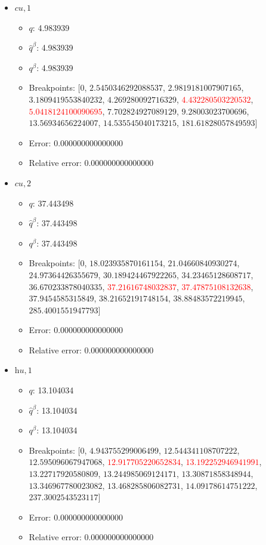 \documentclass{article}%
\begin{document}
\begin{itemize}
\begin{itemize}
		\item Error: 0.000000000000000%
		\item Relative error: 0.000000000000000%
	\end{itemize}%
	\item $\textit{cu},1$%
	\begin{itemize}%
		\item $q$: 4.983939%
		\item $\hat{q}^\beta$: 4.983939%
		\item $q^\beta$: 4.983939%
		\item Breakpoints: $[$$0$, $2.5450346292088537$, $2.9819181007907165$, $3.1809419553840232$, $4.269280092716329$, \textcolor{red}{$4.432280503220532$}, \textcolor{red}{$5.0418124100090695$}, $7.702824927089129$, $9.28003023700696$, $13.56934656224007$, $14.535545040173215$, $181.61828057849593$$]$%
		\item Error: 0.000000000000000%
		\item Relative error: 0.000000000000000%
	\end{itemize}%
	\item $\textit{cu},2$%
	\begin{itemize}%
		\item $q$: 37.443498%
		\item $\hat{q}^\beta$: 37.443498%
		\item $q^\beta$: 37.443498%
		\item Breakpoints: $[$$0$, $18.023935870161154$, $21.04660840930274$, $24.97364426355679$, $30.189424467922265$, $34.23465128608717$, $36.670233878040335$, \textcolor{red}{$37.21616748032837$}, \textcolor{red}{$37.47875108132638$}, $37.9454585315849$, $38.21652191748154$, $38.88483572219945$, $285.4001551947793$$]$%
		\item Error: 0.000000000000000%
		\item Relative error: 0.000000000000000%
	\end{itemize}%
	\item $\textit{hu},1$%
	\begin{itemize}%
		\item $q$: 13.104034%
		\item $\hat{q}^\beta$: 13.104034%
		\item $q^\beta$: 13.104034%
		\item Breakpoints: $[$$0$, $4.943755299006499$, $12.544341108707222$, $12.595096067947068$, \textcolor{red}{$12.917705220652834$}, \textcolor{red}{$13.192252946941991$}, $13.22717920580809$, $13.244985069124171$, $13.30871858348944$, $13.346967780023082$, $13.468285806082731$, $14.09178614751222$, $237.3002543523117$$]$%
		\item Error: 0.000000000000000%
		\item Relative error: 0.000000000000000%
	\end{itemize}%
\end{itemize}%
\end{document}
